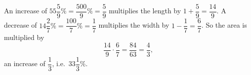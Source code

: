 An increase of $55\dfrac{5}{9}\%=\dfrac{500}{9}\%=\dfrac{5}{9}$ multiplies the length by $1+\dfrac{5}{9}=\dfrac{14}{9}$. A decrease of $14\dfrac{2}{7}\%=\dfrac{100}{7}\%=\dfrac{1}{7}$ multiplies the width by $1-\dfrac{1}{7}=\dfrac{6}{7}$. So the area is multiplied by
\[
\dfrac{14}{9}\cdot\dfrac{6}{7}=\dfrac{84}{63}=\dfrac{4}{3},
\]
an increase of $\dfrac{1}{3}$, i.e.\ $\boxed{33\dfrac{1}{3}\%}$.
